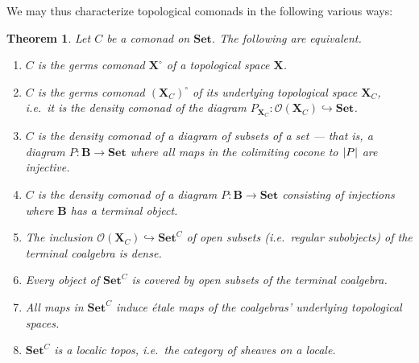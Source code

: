 \documentclass[11pt, oneside, article]{memoir}
\theoremstyle{plain}
\newtheorem{theorem}{Theorem}[section]
\theoremstyle{definition}
\theoremstyle{remark}
\DeclarePairedDelimiter{\abs}{\lvert}{\rvert}
\newcommand{\namedcat}[1]{\mathbf{#1}}
\newcommand{\cat}[1]{\mathbf{#1}}
\newcommand{\spa}[1]{\mathbf{#1}}
\newcommand{\Set}{\namedcat{Set}}
\newcommand{\CoalgOn}[2]{{#2}^{#1}}
\newcommand{\CoalgSet}[1]{\CoalgOn{#1}{\Set}}
\newcommand{\pts}[1]{{\abs{#1}}}
\newcommand{\ph}[1]{#1}
\newcommand{\topbasis}[1]{\pP_{#1}}
\newcommand{\cmnd}[1]{{#1}}
\newcommand{\cC}{\cmnd{C}}
\newcommand{\bB}{\cat{B}}
\newcommand{\pP}{\ph{P}}
\newcommand{\tX}{\spa{X}}
\newcommand{\cX}{\toptocmd{\tX}}
\newcommand{\CSet}{\CoalgSet{\cC}}
\newcommand{\toptocmd}[1]{{{#1}^\circ}}
\newcommand{\cmdtotop}[1]{{\tX_{#1}}}
\newcommand{\opens}[1]{\mathcal{O}(#1)}
\begin{document}
We may thus characterize topological comonads in the following various
ways:

\begin{theorem}\label{thm:tfaetop}
  Let $\cC$ be a comonad on $\Set$. The following are equivalent.
  \begin{enumerate}[label=(\roman*)]
  \item\label{item:topological} $\cC$ is the germs comonad $\cX$ of a
    topological space $\tX$.
  \item\label{item:owntopological} $\cC$ is the germs comonad
    $\toptocmd{(\cmdtotop{\cC})}$ of its underlying topological space
    $\cmdtotop{\cC}$, i.e.\ it is the density comonad of the diagram
    $\topbasis{\cmdtotop{\cC}} \colon \opens{\cmdtotop{\cC}} \hookrightarrow
    \Set$.
  \item\label{item:subsets} $\cC$ is the density comonad of a diagram
    of subsets of a set --- that is, a diagram
    $\pP \colon \bB \to \Set$ where all maps in the colimiting cocone
    to $\pts{\pP}$ are injective.
  \item\label{item:subsetsterm} $\cC$ is the density comonad of a
    diagram $\pP \colon \bB \to \Set$ consisting of injections where
    $\bB$ has a terminal object.
  \item\label{item:densesubterms} The inclusion
    $\opens{\cmdtotop{\cC}} \hookrightarrow \CSet$ of open subsets
    (i.e.\ regular subobjects) of the terminal coalgebra is dense.
  \item\label{item:subterms} Every object of $\CSet$ is covered by
    open subsets of the terminal coalgebra.
  \item\label{item:alletale} All maps in $\CSet$ induce \'etale maps of
    the coalgebras' underlying topological spaces.
  \item\label{item:localic} $\CSet$ is a localic topos, i.e.\ the
    category of sheaves on a locale.
  \end{enumerate}
\end{theorem}
\end{document}

